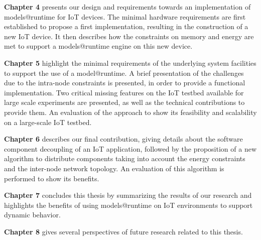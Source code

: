 \textbf{Chapter 4} presents our design and requirements towards an implementation of models@runtime for IoT devices.
The minimal hardware requirements are first established to propose a first implementation, resulting in the construction of a new IoT device.
It then describes how the constraints on memory and energy are met to support a models@runtime engine on this new device.

\textbf{Chapter 5} highlight the minimal requirements of the underlying system facilities to support the use of a model@runtime.
A brief presentation of the challenges due to the intra-node constraints is presented, in order to provide a functional implementation.
Two critical missing features on the IoT testbed available for large scale experiments are presented, as well as the technical contributions to provide them.
An evaluation of the approach to show its feasibility and scalability on a large-scale IoT testbed.

\textbf{Chapter 6} describes our final contribution, giving details about the software component decoupling of an IoT application, followed by the proposition of a new algorithm to distribute components taking into account the energy constraints and the inter-node network topology.
An evaluation of this algorithm is performed to show its benefits.

\textbf{Chapter 7} concludes this thesis by summarizing the results of our research and highlights the benefits of using models@runtime on IoT environments to support dynamic behavior.

\textbf{Chapter 8} gives several perspectives of future research related to this thesis.